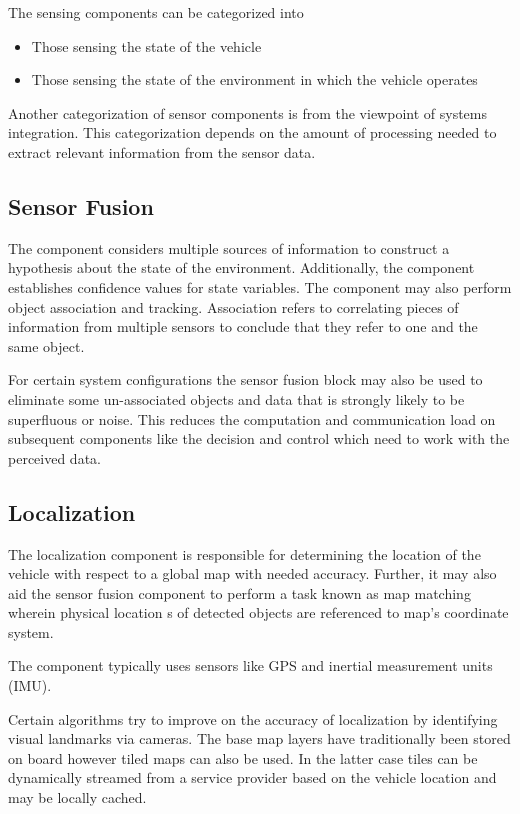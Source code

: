 The sensing components can be categorized into \cite{Bahere}
\begin{itemize}
\item Those sensing the state of the vehicle 
\item Those sensing the state of the environment in which the vehicle operates
\end{itemize}
Another categorization of sensor components is from the viewpoint of systems integration. 
This categorization depends on the amount of processing needed to extract relevant information from the sensor data.

\subsection{Sensor Fusion}

The component considers multiple sources of information to construct a hypothesis about the state of the environment. 
Additionally, the component establishes confidence values for state variables. 
The component may also perform object association and tracking. Association refers to correlating pieces of
information from multiple sensors to conclude that they refer to one and the same object.

For certain system configurations the sensor fusion block may also be used to eliminate some un-associated objects and data that 
is strongly likely to be superfluous or noise. This reduces the computation and communication load on 
subsequent components like the decision and control which need to work with the perceived data.


\subsection{Localization}

The localization component is responsible for determining the location of the vehicle with respect to a global map with needed accuracy.
Further, it may also aid the sensor fusion component to perform a task known as map matching wherein physical location s of detected objects are referenced to map’s coordinate system. 

The component typically uses sensors like GPS and inertial measurement units (IMU).

Certain algorithms try to improve on the accuracy of localization by identifying visual landmarks via cameras. The base map layers have traditionally been stored on board however tiled maps can also be used. In the latter case tiles can be dynamically streamed from a service provider based on the vehicle location and may be locally cached.


